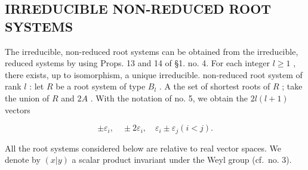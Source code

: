 \subsection{IRREDUCIBLE NON-REDUCED ROOT SYSTEMS}

The irreducible, non-reduced root systems can be obtained from the irreducible, reduced systems by using Props. 13 and 14 of §1. no. 4. For each integer \(l \geqslant 1\) , there exists, up to isomorphism, a unique irreducible. non-reduced root system of rank \(l\) : let \(R\) be a root system of type \(B_l\) . A the set of shortest roots of \(R\) ; take the union of \(R\) and \(2A\) . With the notation of no. 5, we obtain the \(2l(l + 1)\) vectors

\[
\pm \varepsilon_ {i}, \quad \pm 2 \varepsilon_ {i}, \quad \varepsilon_ {i} \pm \varepsilon_ {j} (i <   j).
\]


All the root systems considered below are relative to real vector spaces. We denote by \((x|y)\) a scalar product invariant under the Weyl group (cf.~no. 3).

